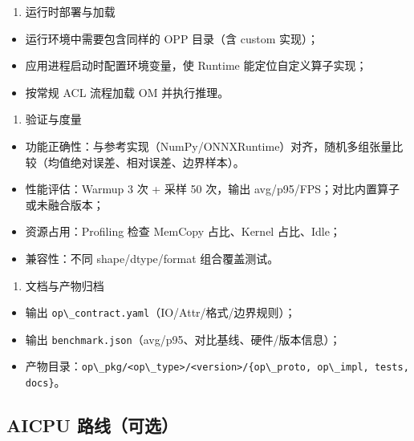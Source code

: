 \begin{enumerate}
\def\labelenumi{\arabic{enumi})}
\setcounter{enumi}{5}
\tightlist
\item
  运行时部署与加载
\end{enumerate}

\begin{itemize}
\tightlist
\item
  运行环境中需要包含同样的 OPP 目录（含 custom 实现）；
\item
  应用进程启动时配置环境变量，使 Runtime 能定位自定义算子实现；
\item
  按常规 ACL 流程加载 OM 并执行推理。
\end{itemize}

\begin{enumerate}
\def\labelenumi{\arabic{enumi})}
\setcounter{enumi}{6}
\tightlist
\item
  验证与度量
\end{enumerate}

\begin{itemize}
\tightlist
\item
  功能正确性：与参考实现（NumPy/ONNXRuntime）对齐，随机多组张量比较（均值绝对误差、相对误差、边界样本）。
\item
  性能评估：Warmup 3 次 + 采样 50 次，输出
  avg/p95/FPS；对比内置算子或未融合版本；
\item
  资源占用：Profiling 检查 MemCopy 占比、Kernel 占比、Idle；
\item
  兼容性：不同 shape/dtype/format 组合覆盖测试。
\end{itemize}

\begin{enumerate}
\def\labelenumi{\arabic{enumi})}
\setcounter{enumi}{7}
\tightlist
\item
  文档与产物归档
\end{enumerate}

\begin{itemize}
\tightlist
\item
  输出
  \passthrough{\lstinline!op\_contract.yaml!}（IO/Attr/格式/边界规则）；
\item
  输出
  \passthrough{\lstinline!benchmark.json!}（avg/p95、对比基线、硬件/版本信息）；
\item
  产物目录：\passthrough{\lstinline!op\_pkg/<op\_type>/<version>/\{op\_proto, op\_impl, tests, docs\}!}。
\end{itemize}

\subsection{AICPU 路线（可选）}\label{aicpu-ux8defux7ebfux53efux9009}

